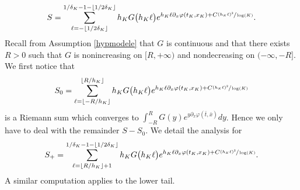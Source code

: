 \documentclass[10pt]{amsart}
\theoremstyle{plain}
\theoremstyle{remark}
\begin{document}
\[
S= \sum_{\ell=-\lfloor 1/2\delta_K\rfloor}^{1/\delta_K-1-\lfloor 1/2\delta_K\rfloor} h_K G\big(h_K\ell \big)e^{h_K\ell\partial_x\varphi(t_K,x_K)+C\sfrac{(h_K\ell)^2}{\log(K)}}.
\]
Recall from Assumption \ref{hypmodele} that $G$ is continuous and that there exists $R>0$ such that $G$ is nonincreasing on $[R,+\infty)$ and nondecreasing on $(-\infty,-R]$. We first notice that
\[
S_0=\sum_{\ell=\lfloor -R/h_K \rfloor}^{\lfloor R/h_K\rfloor } h_K G\big(h_K\ell \big)e^{h_K\ell\partial_x\varphi(t_K,x_K)+C\sfrac{(h_K\ell)^2}{\log(K)}}
\]
is a Riemann sum which converges to $\int_{-R}^R G(y) e^{y\partial_x\varphi(\bar t,\bar x)}dy$. Hence we only have to deal with the remainder $S-S_0$. We detail the analysis for\vspace*{-3pt}
\[
S_+=\sum_{\ell= \lfloor R/h_K\rfloor +1}^{1/\delta_K-1-\lfloor 1/2\delta_K\rfloor}h_K G\big(h_K\ell \big)e^{h_K\ell\partial_x\varphi(t_K,x_K)+C\sfrac{(h_K\ell)^2}{\log(K)}}.
\]
A similar computation applies to the lower tail.
\end{document}
